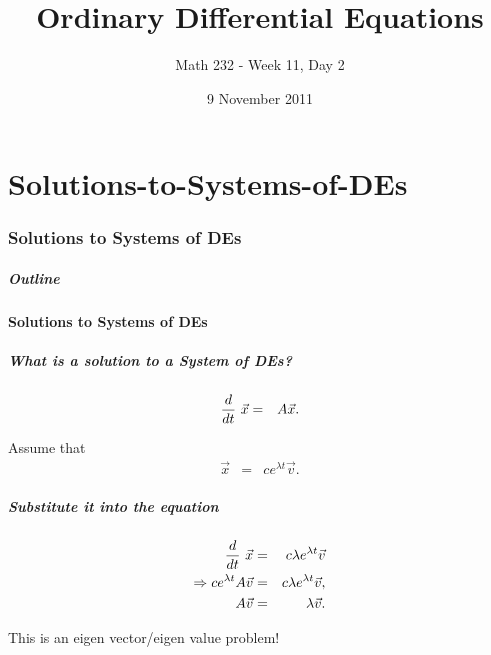 \part{Solutions-to-Systems-of-DEs}
\section{Solutions to Systems of DEs}


\title{Ordinary Differential Equations}
\subtitle{Math 232 - Week 11, Day 2}
\date{9 November 2011}

\begin{frame}
  \titlepage
\end{frame}

\begin{frame}
  \frametitle{Outline}
\end{frame}


\subsection{Solutions to Systems of DEs}


\begin{frame}
  \frametitle{What is a solution to a System of DEs?}

  \begin{eqnarray*}
    \deriv{~}{t} \vec{x} & = & A \vec{x}.
  \end{eqnarray*}

  {
    Assume that 
    \begin{eqnarray*}
      \vec{x} & = & c e^{\lambda t} \vec{v}.
    \end{eqnarray*}
  }


\end{frame}


\begin{frame}
  \frametitle{Substitute it into the equation}

  \begin{eqnarray*}
    \deriv{~}{t} \vec{x} & = & c \lambda e^{\lambda t} \vec{v} \\
    \Rightarrow c  e^{\lambda t} A \vec{v} & = & c \lambda e^{\lambda t} \vec{v}, \\
    A \vec{v} & = & \lambda \vec{v}.
  \end{eqnarray*}

  This is an eigen vector/eigen value problem!

\end{frame}


